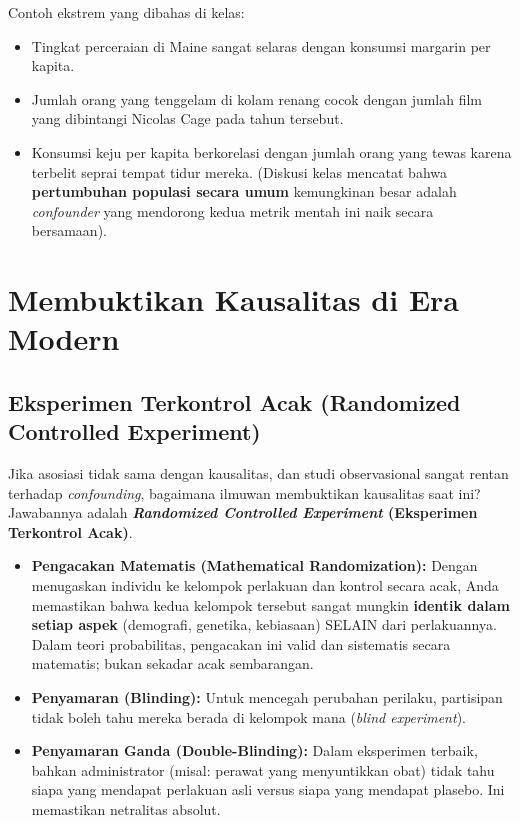 \documentclass[12pt,a4paper]{article}
\begin{document}
Contoh ekstrem yang dibahas di kelas:
\begin{itemize}
    \item Tingkat perceraian di Maine sangat selaras dengan konsumsi margarin per kapita.
    \item Jumlah orang yang tenggelam di kolam renang cocok dengan jumlah film yang dibintangi Nicolas Cage pada tahun tersebut.
    \item Konsumsi keju per kapita berkorelasi dengan jumlah orang yang tewas karena terbelit seprai tempat tidur mereka. (Diskusi kelas mencatat bahwa \textbf{pertumbuhan populasi secara umum} kemungkinan besar adalah \textit{confounder} yang mendorong kedua metrik mentah ini naik secara bersamaan).
\end{itemize}

\newpage
\section{Membuktikan Kausalitas di Era Modern}


\subsection{Eksperimen Terkontrol Acak (Randomized Controlled Experiment)}
Jika asosiasi tidak sama dengan kausalitas, dan studi observasional sangat rentan terhadap \textit{confounding}, bagaimana ilmuwan membuktikan kausalitas saat ini? Jawabannya adalah \textbf{\textit{Randomized Controlled Experiment} (Eksperimen Terkontrol Acak)}.

\begin{itemize}
    \item \textbf{Pengacakan Matematis (Mathematical Randomization):} Dengan menugaskan individu ke kelompok perlakuan dan kontrol secara acak, Anda memastikan bahwa kedua kelompok tersebut sangat mungkin \textbf{identik dalam setiap aspek} (demografi, genetika, kebiasaan) SELAIN dari perlakuannya. Dalam teori probabilitas, pengacakan ini valid dan sistematis secara matematis; bukan sekadar acak sembarangan.
    \item \textbf{Penyamaran (Blinding):} Untuk mencegah perubahan perilaku, partisipan tidak boleh tahu mereka berada di kelompok mana (\textit{blind experiment}).
    \item \textbf{Penyamaran Ganda (Double-Blinding):} Dalam eksperimen terbaik, bahkan administrator (misal: perawat yang menyuntikkan obat) tidak tahu siapa yang mendapat perlakuan asli versus siapa yang mendapat plasebo. Ini memastikan netralitas absolut.
\end{itemize}
\end{document}
